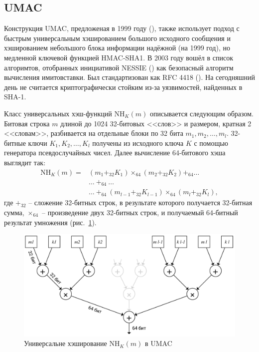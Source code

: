 \subsection{UMAC}\label{sec:umac}

Конструкция UMAC, предложеная в 1999 году (\cite{Black:Halevi:Krawczyk:etc:1999}), также использует подход с быстрым универсальным хэшированием большого исходного сообщения и хэшированием небольшого блока информации надёжной (на 1999 год), но медленной ключевой функцией HMAC-SHA1. В 2003 году вошёл в список алгоримтов, отобранных инициативой NESSIE () как безопасный алгоритм вычисления имитовставки. Был стандартизован как RFC 4418 (\cite{rfc4418}). На сегодняшний день не считается криптографически стойким из-за уязвимостей, найденных в SHA-1.

Класс универсальных хэш-функций $\textrm{NH}_K (m)$ описывается следующим образом. Битовая строка $m$ длиной до 1024 32-битовых <<слов>> и размером, кратная 2 <<словам>>, разбивается на отдельные блоки по 32 бита $m_1, m_2, \dots, m_l$. 32-битные ключи $K_1, K_2, \dots, K_l$ получены из исходного ключа $K$ с помощью генератора псевдослучайных чисел. Далее вычисление 64-битового хэша выглядит так: \[\begin{array}{ll}
    \textrm{NH}_K (m) = & ( m_1 +_{32}K_1) \times_{64} (m_2 +_{32} K_2) +_{64} \dots \\
                        & \dots ~ +_{64} ~ \dots \\
                        & \dots ~ +_{64} ~ (m_{l-1} +_{32} K_{l-1}) \times_{64} (m_l+_{32}K_l),
\end{array} \] где $+_{32}$ -- сложение 32-битных строк, в результате которого получается 32-битная сумма, $\times_{64}$ -- произведение двух 32-битных строк, и получаемый 64-битный результат умножения (рис.~\ref{fig:UMAC}).

\begin{figure}
    \centering
    \includegraphics[width=1\textwidth]{pic/UMAC}
    \caption{Универсальне хэширование $\textrm{NH}_K (m)$ в UMAC}
    \label{fig:UMAC}
\end{figure}

